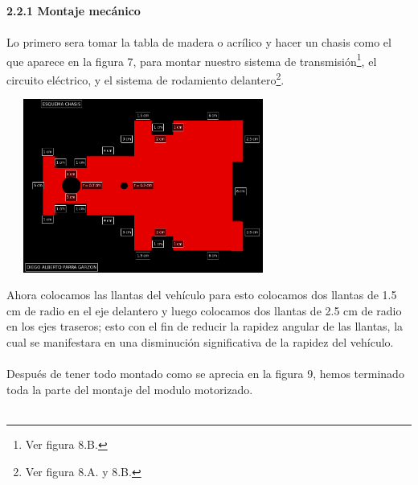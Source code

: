 \documentclass[12]{article}
\newenvironment{Figure}
{\par\medskip\noindent\minipage{\linewidth}}
{\endminipage\par\medskip}
\begin{document}
\begin{multicols}{2}
{\bf{2.2.1 Montaje mecánico}}\\\\
Lo primero sera tomar la tabla de madera o acrílico y hacer un chasis  como el que aparece en la figura 7, para montar nuestro sistema de transmisión\footnote{Ver figura 8.B.}, el circuito eléctrico, y el sistema de rodamiento delantero\footnote{Ver figura 8.A. y 8.B.}.
\begin{Figure}	
\center
\includegraphics[width=9cm, height=5.7cm]{img/chasis.png} 
\label{fig:g7}
\end{Figure}
\vspace{0.6 cm}
Ahora colocamos las llantas del vehículo para esto colocamos dos llantas de 1.5 cm de radio en el eje delantero y luego colocamos dos llantas de 2.5 cm de radio en los ejes traseros; esto con el fin de reducir la rapidez angular de las llantas, la cual se manifestara en una disminución significativa de la rapidez del vehículo.\\\\
Después de tener todo montado como se aprecia en la figura 9, hemos terminado toda la parte del montaje del modulo motorizado.\\\\


\end{multicols}
\end{document}
